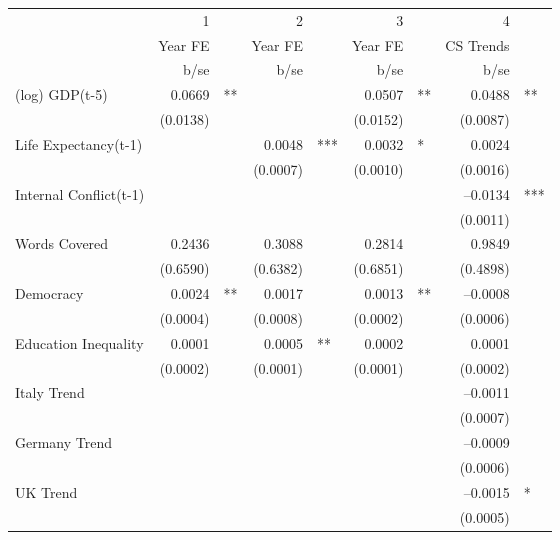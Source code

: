 \begin{tabular} {l* {4}{r @{} l}}
\hline
            &           1&   &           2&   &           3&   &           4&   \\
            &     Year FE&   &     Year FE&   &     Year FE&   &   CS Trends&   \\
            &        b/se&   &        b/se&   &        b/se&   &        b/se&   \\
\hline
(log) GDP(t-5)&      0.0669&** &            &   &      0.0507&** &      0.0488&** \\
            &    (0.0138)&   &            &   &    (0.0152)&   &    (0.0087)&   \\
Life Expectancy(t-1) &            &   &      0.0048&***&      0.0032&*  &      0.0024&   \\
            &            &   &    (0.0007)&   &    (0.0010)&   &    (0.0016)&   \\
Internal Conflict(t-1)&            &   &            &   &            &   &    --0.0134&***\\
            &            &   &            &   &            &   &    (0.0011)&   \\
Words Covered&      0.2436&   &      0.3088&   &      0.2814&   &      0.9849&   \\
            &    (0.6590)&   &    (0.6382)&   &    (0.6851)&   &    (0.4898)&   \\
Democracy   &      0.0024&** &      0.0017&   &      0.0013&** &    --0.0008&   \\
            &    (0.0004)&   &    (0.0008)&   &    (0.0002)&   &    (0.0006)&   \\
Education Inequality&      0.0001&   &      0.0005&** &      0.0002&   &      0.0001&   \\
            &    (0.0002)&   &    (0.0001)&   &    (0.0001)&   &    (0.0002)&   \\
Italy Trend &            &   &            &   &            &   &    --0.0011&   \\
            &            &   &            &   &            &   &    (0.0007)&   \\
Germany Trend&            &   &            &   &            &   &    --0.0009&   \\
            &            &   &            &   &            &   &    (0.0006)&   \\
UK Trend    &            &   &            &   &            &   &    --0.0015&*  \\
            &            &   &            &   &            &   &    (0.0005)&   \\

\end{tabular}
